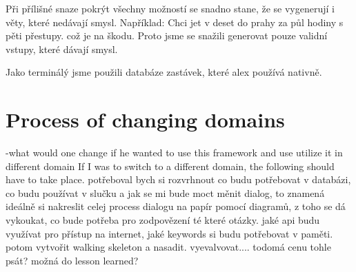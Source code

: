 Při přílišné snaze pokrýt všechny možností se snadno stane, že se vygenerují i věty, které nedávají smysl. Například: Chci jet v deset do prahy za půl hodiny s pěti přestupy. což je na škodu. Proto jsme se snažili generovat pouze validní vstupy, které dávají smysl.

Jako terminálý jsme použili databáze zastávek, které alex používá nativně.


\section{Process of changing domains} 
  -what would one change if he wanted to use this framework and use utilize it in different domain
  If I was to switch to a different domain, the following should have to take place.
  potřeboval bych si rozvrhnout co budu potřebovat v databázi, co budu používat v slučku a jak se mi bude moct měnit dialog, to znamená ideálně si nakreslit celej process dialogu na papír pomocí diagramů, z toho se dá vykoukat, co bude potřeba pro zodpovězení té které otázky. jaké api budu využívat pro přístup na internet, jaké keywords si budu potřebovat v paměti. potom vytvořit walking skeleton a nasadit. vyevalvovat....
  todo{má cenu tohle psát?} možná do lesson learned?
  
